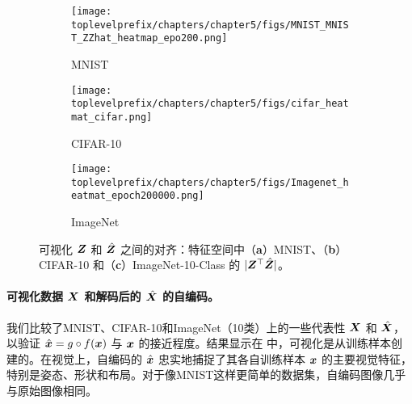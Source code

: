 \documentclass[../../book-main_zh.tex]{subfiles}
\begin{document}
\begin{figure}[t]
    \begin{subfigure}[t]{0.3\textwidth}
        \centering
        \texttt{[image: \\toplevelprefix/chapters/chapter5/figs/MNIST\_MNIST\_ZZhat\_heatmap\_epo200.png]}
        \caption{MNIST}
    \end{subfigure}
    \hfill
    \begin{subfigure}[t]{0.3\textwidth}
        \centering
        \texttt{[image: \\toplevelprefix/chapters/chapter5/figs/cifar\_heatmat\_cifar.png]}
        \caption{CIFAR-10}
    \end{subfigure}
    \hfill
    \begin{subfigure}[t]{0.3\textwidth}
        \centering
        \texttt{[image: \\toplevelprefix/chapters/chapter5/figs/Imagenet\_heatmat\_epoch200000.png]}
        \caption{ImageNet}
    \end{subfigure}
    \caption{可视化 $\bm{Z}$ 和 $\hat{\bm{Z}}$ 之间的对齐：特征空间中（\textbf{a}）MNIST、（\textbf{b}）CIFAR-10 和（\textbf{c}）ImageNet-10-Class 的 $|\bm{Z}^\top \hat{\bm{Z}}|$。}
    \label{fig:justifyz=z}
\end{figure}
 





\paragraph{可视化数据 $\bm{X}$ 和解码后的 $\hat {\bm{X}}$ 的自编码。} 我们比较了MNIST、CIFAR-10和ImageNet（10类）上的一些代表性 $\bm{X}$ 和 $\hat{\bm{X}}$，以验证 $\hat {\bm{x}} = g\circ f(\bm{x})$ 与 $\bm{x}$ 的接近程度。结果显示在  中，可视化是从训练样本创建的。在视觉上，自编码的 $\hat {\bm{x}}$ 忠实地捕捉了其各自训练样本 $\bm{x}$ 的主要视觉特征，特别是姿态、形状和布局。对于像MNIST这样更简单的数据集，自编码图像几乎与原始图像相同。
\end{document}
